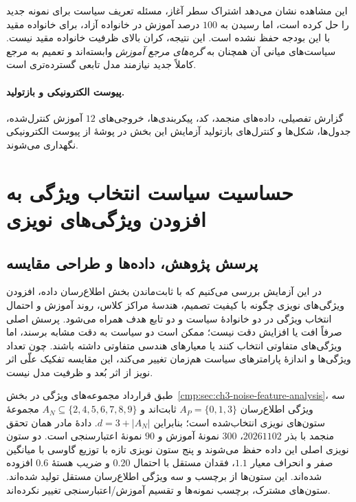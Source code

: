 این مشاهده نشان می‌دهد اشتراک سطر آغاز، مسئله تعریف
سیاست برای نمونه جدید را حل کرده است، اما رسیدن به
$100$ درصد آموزش در خانواده آزاد، برای خانواده مقید
با این بودجه حفظ نشده است. این نتیجه، کران بالای
ظرفیت خانواده مقید نیست. سیاست‌های میانی آن همچنان
به \emph{گره‌های مرجع آموزش} وابسته‌اند و تعمیم
به مرجع کاملاً جدید نیازمند مدل تابعی گسترده‌تری است.

\paragraph{پیوست الکترونیکی و بازتولید.}
گزارش تفصیلی، داده‌های منجمد، کد، پیکربندی‌ها، خروجی‌های
$12$ آموزش کنترل‌شده، جدول‌ها، شکل‌ها و کنترل‌های بازتولید
آزمایش این بخش در پوشهٔ
از پیوست الکترونیکی نگهداری می‌شوند.

\section{حساسیت سیاست انتخاب ویژگی به افزودن ویژگی‌های نویزی}
\label{sec:ch4-noise-feature-sensitivity}

\subsection{پرسش پژوهش، داده‌ها و طراحی مقایسه}
\label{subsec:ch4-e14-design}

در این آزمایش بررسی می‌کنیم که با ثابت‌ماندن بخش اطلاع‌رسان داده،
افزودن ویژگی‌های نویزی چگونه با کیفیت تصمیم،
هندسهٔ مراکز کلاس، روند آموزش و احتمال انتخاب ویژگی
در دو خانوادهٔ سیاست و دو تابع هدف همراه می‌شود.
پرسش اصلی صرفاً افت یا افزایش دقت نیست؛
ممکن است دو سیاست به دقت مشابه برسند،
اما ویژگی‌های متفاوتی انتخاب کنند یا
معیارهای هندسی متفاوتی داشته باشند.
چون تعداد ویژگی‌ها و اندازهٔ پارامترهای سیاست هم‌زمان
تغییر می‌کند، این مقایسه تفکیک علّی
اثر نویز از اثر بُعد و ظرفیت مدل نیست.

طبق قرارداد مجموعه‌های ویژگی در
بخش~\ref{cmp:sec:ch3-noise-feature-analysis}،
سه ویژگی اطلاع‌رسان
$A_P=\{0,1,3\}$ ثابت‌اند و
$A_N\subseteq\{2,4,5,6,7,8,9\}$
مجموعهٔ ستون‌های نویزی انتخاب‌شده است؛
بنابراین $d=3+|A_N|$.
دادهٔ مادر همان تحقق منجمد با بذر $20261102$،
$300$ نمونهٔ آموزش و $90$ نمونهٔ اعتبارسنجی است.
دو ستون نویزی اصلی این داده حفظ می‌شوند
و پنج ستون نویزی تازه با توزیع گاوسی
با میانگین صفر و انحراف معیار $1.1$،
فقدان مستقل با احتمال $0.20$
و ضریب هستهٔ $0.6$ افزوده شده‌اند.
این ستون‌ها از برچسب و سه ویژگی اطلاع‌رسان
مستقل تولید شده‌اند.
ستون‌های مشترک، برچسب نمونه‌ها و
تقسیم آموزش/اعتبارسنجی تغییر نکرده‌اند.

